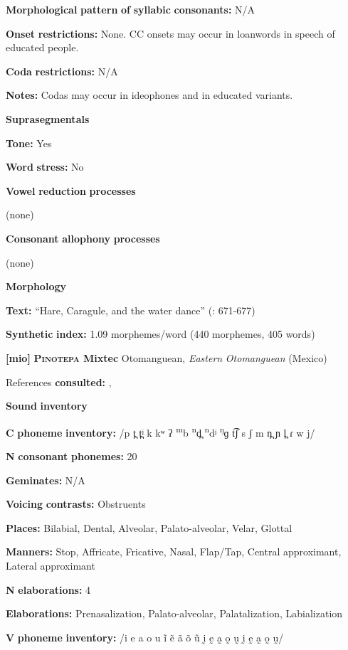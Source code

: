 \textbf{Morphological} \textbf{pattern} \textbf{of} \textbf{syllabic} \textbf{consonants:} N/A

\textbf{Onset} \textbf{restrictions:} None. CC onsets may occur in loanwords in speech of educated people.

\textbf{Coda} \textbf{restrictions:} N/A

\textbf{Notes:} Codas may occur in ideophones and in educated variants.

\textbf{Suprasegmentals}

\textbf{Tone:} Yes

\textbf{Word} \textbf{stress:} No

\textbf{Vowel} \textbf{reduction} \textbf{processes}

(none)

\textbf{Consonant} \textbf{allophony} \textbf{processes}

(none)

\textbf{Morphology}

\textbf{Text:} “Hare, Caragule, and the water dance” (\citealt{BlackingsFabb2003}: 671-677)

\textbf{Synthetic} \textbf{index:} 1.09 morphemes/word (440 morphemes, 405 words)

\textbf{[mio]}   \textbf{\textsc{Pinotepa} \textbf{Mixtec}}  Otomanguean, \textit{Eastern} \textit{Otomanguean} (Mexico)

References \textbf{consulted:} \citet{Bradley1970}, \citet{Costello2014}

\textbf{Sound} \textbf{inventory}

\textbf{C} \textbf{phoneme} \textbf{inventory:} /p t̪ t̪ʲ k kʷ ʔ \textsuperscript{m}b \textsuperscript{n}d̪ \textsuperscript{n}dʲ \textsuperscript{ŋ}ɡ t͡ʃ s ʃ m n̪ ɲ l̪ ɾ w j/

\textbf{N} \textbf{consonant} \textbf{phonemes:} 20

\textbf{Geminates:} N/A

\textbf{Voicing} \textbf{contrasts:} Obstruents

\textbf{Places:} Bilabial, Dental, Alveolar, Palato-alveolar, Velar, Glottal

\textbf{Manners:} Stop, Affricate, Fricative, Nasal, Flap/Tap, Central approximant, Lateral approximant

\textbf{N} \textbf{elaborations:} 4

\textbf{Elaborations:} Prenasalization, Palato-alveolar, Palatalization, Labialization

\textbf{V} \textbf{phoneme} \textbf{inventory:} /i e a o u ĩ ẽ ã õ ũ ḭ ḛ a̰ o̰ ṵ ḭ ḛ a̰ o̰ ṵ/

